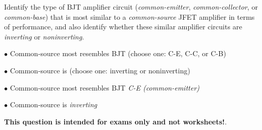 

Identify the type of BJT amplifier circuit ({\it common-emitter}, {\it common-collector}, or {\it common-base}) that is most similar to a {\it common-source} JFET amplifier in terms of performance, and also identify whether these similar amplifier circuits are {\it inverting} or {\it noninverting}.

\medskip
\item{$\bullet$} Common-source most resembles BJT (choose one: C-E, C-C, or C-B)
\item{$\bullet$} Common-source is (choose one: inverting or noninverting)
\medskip







\medskip
\item{$\bullet$} Common-source most resembles BJT {\it C-E (common-emitter)}
\item{$\bullet$} Common-source is {\it inverting}
\medskip







{\bf This question is intended for exams only and not worksheets!}.




